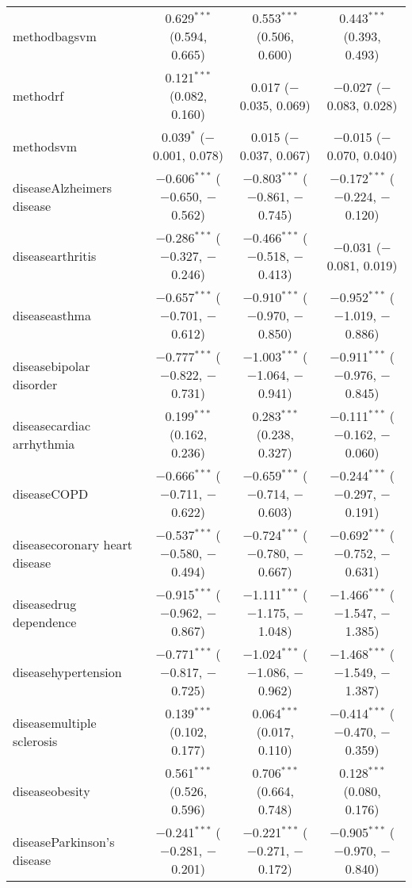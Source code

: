\begin{table}[!htbp]
\begin{tabular}{@{\extracolsep{5pt}}lccc}
  methodbagsvm & 0.629$^{***}$ (0.594, 0.665) & 0.553$^{***}$ (0.506, 0.600) & 0.443$^{***}$ (0.393, 0.493) \\ 
  methodrf & 0.121$^{***}$ (0.082, 0.160) & 0.017 ($-$0.035, 0.069) & $-$0.027 ($-$0.083, 0.028) \\ 
  methodsvm & 0.039$^{*}$ ($-$0.001, 0.078) & 0.015 ($-$0.037, 0.067) & $-$0.015 ($-$0.070, 0.040) \\ 
  diseaseAlzheimers disease & $-$0.606$^{***}$ ($-$0.650, $-$0.562) & $-$0.803$^{***}$ ($-$0.861, $-$0.745) & $-$0.172$^{***}$ ($-$0.224, $-$0.120) \\ 
  diseasearthritis & $-$0.286$^{***}$ ($-$0.327, $-$0.246) & $-$0.466$^{***}$ ($-$0.518, $-$0.413) & $-$0.031 ($-$0.081, 0.019) \\ 
  diseaseasthma & $-$0.657$^{***}$ ($-$0.701, $-$0.612) & $-$0.910$^{***}$ ($-$0.970, $-$0.850) & $-$0.952$^{***}$ ($-$1.019, $-$0.886) \\ 
  diseasebipolar disorder & $-$0.777$^{***}$ ($-$0.822, $-$0.731) & $-$1.003$^{***}$ ($-$1.064, $-$0.941) & $-$0.911$^{***}$ ($-$0.976, $-$0.845) \\ 
  diseasecardiac arrhythmia & 0.199$^{***}$ (0.162, 0.236) & 0.283$^{***}$ (0.238, 0.327) & $-$0.111$^{***}$ ($-$0.162, $-$0.060) \\ 
  diseaseCOPD & $-$0.666$^{***}$ ($-$0.711, $-$0.622) & $-$0.659$^{***}$ ($-$0.714, $-$0.603) & $-$0.244$^{***}$ ($-$0.297, $-$0.191) \\ 
  diseasecoronary heart disease & $-$0.537$^{***}$ ($-$0.580, $-$0.494) & $-$0.724$^{***}$ ($-$0.780, $-$0.667) & $-$0.692$^{***}$ ($-$0.752, $-$0.631) \\ 
  diseasedrug dependence & $-$0.915$^{***}$ ($-$0.962, $-$0.867) & $-$1.111$^{***}$ ($-$1.175, $-$1.048) & $-$1.466$^{***}$ ($-$1.547, $-$1.385) \\ 
  diseasehypertension & $-$0.771$^{***}$ ($-$0.817, $-$0.725) & $-$1.024$^{***}$ ($-$1.086, $-$0.962) & $-$1.468$^{***}$ ($-$1.549, $-$1.387) \\ 
  diseasemultiple sclerosis & 0.139$^{***}$ (0.102, 0.177) & 0.064$^{***}$ (0.017, 0.110) & $-$0.414$^{***}$ ($-$0.470, $-$0.359) \\ 
  diseaseobesity & 0.561$^{***}$ (0.526, 0.596) & 0.706$^{***}$ (0.664, 0.748) & 0.128$^{***}$ (0.080, 0.176) \\ 
  diseaseParkinson's disease & $-$0.241$^{***}$ ($-$0.281, $-$0.201) & $-$0.221$^{***}$ ($-$0.271, $-$0.172) & $-$0.905$^{***}$ ($-$0.970, $-$0.840) \\ 

\end{tabular}
\end{table}
